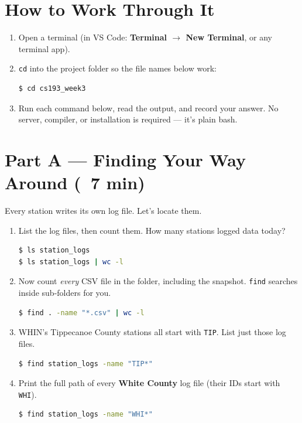\documentclass[11pt]{article}
\begin{document}
\section{How to Work Through It}
\begin{enumerate}
    \item Open a terminal (in VS Code: \textbf{Terminal \(\rightarrow\) New Terminal}, or any terminal app).
    \item \texttt{cd} into the project folder so the file names below work:
\begin{lstlisting}[language=bash]
$ cd cs193_week3
\end{lstlisting}
    \item Run each command below, read the output, and record your answer. No server, compiler, or installation is required --- it's plain bash.
\end{enumerate}

\section{Part A --- Finding Your Way Around (~7 min)}
Every station writes its own log file. Let's locate them.

\begin{enumerate}[label=\textbf{A\arabic*.}]
    \item List the log files, then count them. How many stations logged data today?
\begin{lstlisting}[language=bash]
$ ls station_logs
$ ls station_logs | wc -l
\end{lstlisting}

    \item Now count \textit{every} CSV file in the folder, including the snapshot. \texttt{find} searches inside sub-folders for you.
\begin{lstlisting}[language=bash]
$ find . -name "*.csv" | wc -l
\end{lstlisting}

    \item WHIN's Tippecanoe County stations all start with \texttt{TIP}. List just those log files.
\begin{lstlisting}[language=bash]
$ find station_logs -name "TIP*"
\end{lstlisting}

    \item Print the full path of every \textbf{White County} log file (their IDs start with \texttt{WHI}).
\begin{lstlisting}[language=bash]
$ find station_logs -name "WHI*"
\end{lstlisting}
\end{enumerate}
\end{document}
